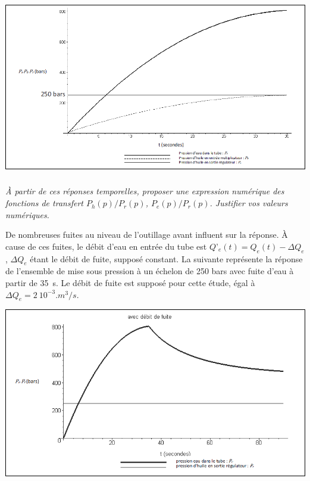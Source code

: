\documentclass[10pt,fleqn]{article} %
\begin{document}
\begin{center}
\includegraphics[width=\linewidth]{images_02/fig_04}
\end{center}

\subparagraph{}
\textit{À partir de ces réponses temporelles, proposer une expression numérique des fonctions de transfert $P_h(p)/P_r(p)$, $P_e(p)/P_r(p)$. Justifier vos valeurs numériques.}

\vspace{.25cm}

De nombreuses fuites au niveau de l’outillage avant influent sur la réponse. À cause de ces fuites, le débit d’eau en entrée du tube est $Q’_e(t) = Q_e(t)-\Delta Q_e$, $\Delta Q_e$ étant le débit de fuite, supposé constant.
La suivante représente la réponse de l’ensemble de mise sous pression à un échelon de 250 bars avec fuite d’eau à partir de \SI{35}{s}. Le débit de fuite est supposé pour cette étude, égal à $\Delta Q_e = \SI{2}{10^{-3}.m^3/s}$.

\begin{center}
\includegraphics[width=\linewidth]{images_02/fig_05}
\end{center}
\end{document}
